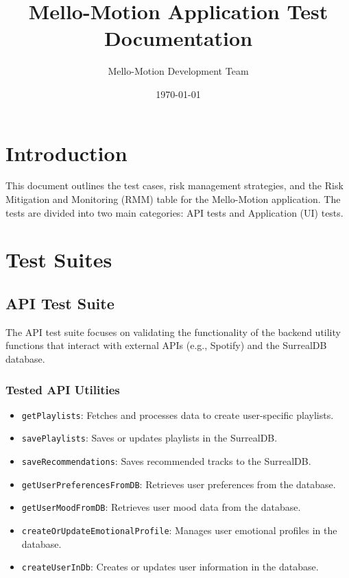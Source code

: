 \documentclass{article}
\title{\textcolor{primary}{\textbf{Mello-Motion Application Test Documentation}}}
\author{\textcolor{secondary}{Mello-Motion Development Team}}
\date{\textcolor{secondary}{\today}}
\begin{document}
\maketitle
\thispagestyle{empty} %
\newpage

\tableofcontents
\newpage

\section{Introduction}
This document outlines the test cases, risk management strategies, and the Risk Mitigation and Monitoring (RMM) table for the Mello-Motion application. The tests are divided into two main categories: API tests and Application (UI) tests.

\section{Test Suites}

\subsection{API Test Suite}
The API test suite focuses on validating the functionality of the backend utility functions that interact with external APIs (e.g., Spotify) and the SurrealDB database.

\subsubsection{Tested API Utilities}
\begin{itemize}
    \item \texttt{getPlaylists}: Fetches and processes data to create user-specific playlists.
    \item \texttt{savePlaylists}: Saves or updates playlists in the SurrealDB.
    \item \texttt{saveRecommendations}: Saves recommended tracks to the SurrealDB.
    \item \texttt{getUserPreferencesFromDB}: Retrieves user preferences from the database.
    \item \texttt{getUserMoodFromDB}: Retrieves user mood data from the database.
    \item \texttt{createOrUpdateEmotionalProfile}: Manages user emotional profiles in the database.
    \item \texttt{createUserInDb}: Creates or updates user information in the database.
\end{itemize}
\end{document}
